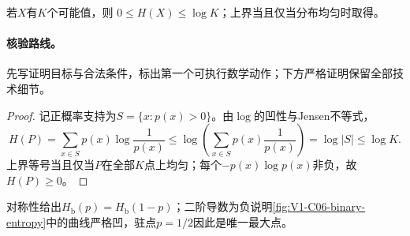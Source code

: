 \documentclass[UTF8,a4paper,11pt,openany]{ctexbook}
\begin{document}
\setcounter{page}{98}
\setcounter{chapter}{6}
\setcounter{figure}{0}
\pagestyle{headings}
\begin{theorem}[有限均匀分布最大熵]
若$X$有$K$个可能值，则 $0\le H(X)\le\log K$；上界当且仅当分布均匀时取得。
\end{theorem}
\paragraph{核验路线。}先写证明目标与合法条件，标出第一个可执行数学动作；下方严格证明保留全部技术细节。
\begin{proof}
记正概率支持为$S=\{x:p(x)>0\}$。由$\log$的凹性与Jensen不等式，
\[
H(P)=\sum_{x\in S}p(x)\log\frac1{p(x)}
\le\log\!\left(\sum_{x\in S}p(x)\frac1{p(x)}\right)
=\log|S|\le\log K.
\]
上界等号当且仅当$P$在全部$K$点上均匀；每个$-p(x)\log p(x)$非负，故$H(P)\ge0$。
\end{proof}

对称性给出$H_{\mathrm b}(p)=H_{\mathrm b}(1-p)$；二阶导数为负说明\cref{fig:V1-C06-binary-entropy}中的曲线严格凹，驻点$p=1/2$因此是唯一最大点。
\end{document}
